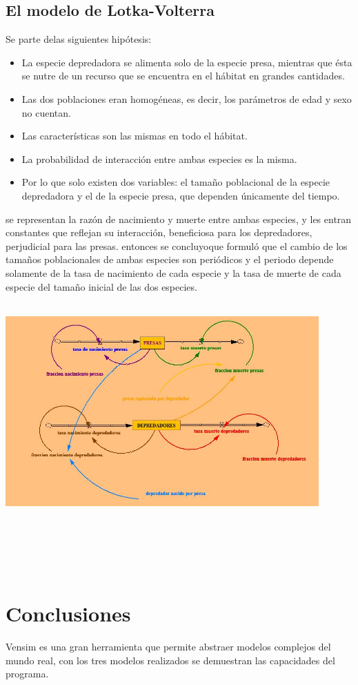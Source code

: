 \documentclass[12pt,letterpaper]{article}
\begin{document}
\subsection{El modelo de Lotka-Volterra }
Se parte delas siguientes hipótesis:\\
\begin{itemize}

\item La especie depredadora se alimenta solo de la especie presa, mientras que ésta se nutre de un recurso que se encuentra en el hábitat en grandes cantidades.
\item Las dos poblaciones eran homogéneas, es decir, los parámetros de edad y sexo no cuentan.
\item  Las características son las mismas en todo el hábitat.
\item La probabilidad de interacción entre ambas especies es la misma.
\item Por lo que solo existen dos variables: el tamaño poblacional de la especie depredadora y el de la especie presa, que dependen únicamente del tiempo.
\end{itemize}
se representan la razón de nacimiento y muerte entre ambas especies, y les entran constantes que reflejan su interacción, beneficiosa para los depredadores, perjudicial para las presas. entonces se concluyoque  formuló que el cambio de los tamaños poblacionales de ambas especies son periódicos y el periodo depende solamente de la tasa de nacimiento de cada especie y la tasa de muerte de cada especie del tamaño inicial de las dos especies.\\\\

\includegraphics[width=12cm, height=8cm]{6.JPG}
\\\\\\\\\

\section{Conclusiones}
	Vensim es una gran herramienta que permite abstraer modelos complejos del mundo real, con los tres modelos realizados se demuestran las capacidades del programa.
\end{document}
